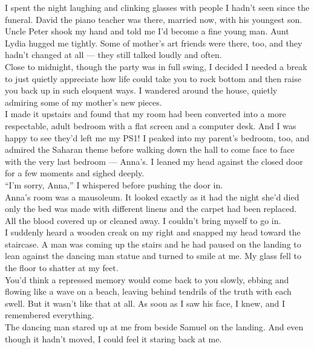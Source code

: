 \documentclass[a5paper]{scrartcl}
\begin{document}
I spent the night laughing and clinking glasses with people I hadn't seen since the funeral. David the piano teacher was there, married now, with his youngest son. Uncle Peter shook my hand and told me I'd become a fine young man. Aunt Lydia hugged me tightly. Some of mother's art friends were there, too, and they hadn't changed at all --- they still talked loudly and often. \\


Close to midnight, though the party was in full swing, I decided I needed a break to just quietly appreciate how life could take you to rock bottom and then raise you back up in such eloquent ways.  I wandered around the house, quietly admiring some of my mother's new pieces.\\


I made it upstairs and found that my room had been converted into a more respectable, adult bedroom with a flat screen and a computer desk. And I was happy to see they'd left me my PS1! I peaked into my parent's bedroom, too, and admired the Saharan theme before walking down the hall to come face to face with the very last bedroom --- Anna's. I leaned my head against the closed door for a few moments and sighed deeply.\\


\enquote{I'm sorry, Anna,} I whispered before pushing the door in.\\


Anna's room was a mausoleum. It looked exactly as it had the night she'd died only the bed was made with different linens and the carpet had been replaced. All the blood covered up or cleaned away. I couldn't bring myself to go in.\\


I suddenly heard a wooden creak on my right and snapped my head toward the staircase. A man was coming up the stairs and he had paused on the landing to lean against the dancing man statue and turned to smile at me. My glass fell to the floor to shatter at my feet.\\


You'd think a repressed memory would come back to you slowly, ebbing and flowing like a wave on a beach, leaving behind tendrils of the truth with each swell. But it wasn't like that at all. As soon as I saw his face, I knew, and I remembered everything. \\


The dancing man stared up at me from beside Samuel on the landing. And even though it hadn't moved, I could feel it staring back at me. \\
\end{document}
